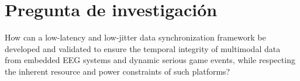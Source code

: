 

\newpage
\section{Pregunta de investigación}\label{sec:question}

How can a low-latency and low-jitter data synchronization framework be developed and validated to ensure the temporal integrity of multimodal data from embedded EEG systems and dynamic serious game events, while respecting the inherent resource and power constraints of such platforms?


